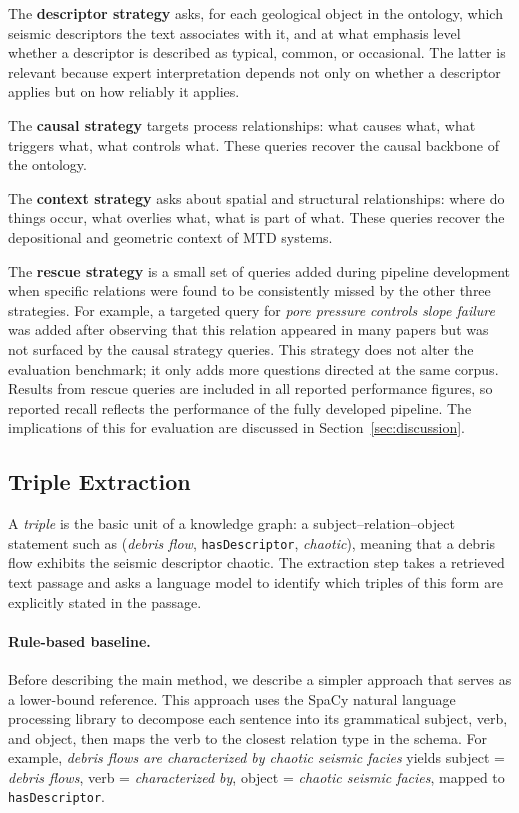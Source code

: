 \documentclass[10pt]{article}
\newcommand{\pred}[1]{\texttt{\small #1}}
\begin{document}
The \textbf{descriptor strategy} asks, for each geological
object in the ontology, which seismic descriptors the text
associates with it, and at what emphasis level  whether a
descriptor is described as typical, common, or occasional.
The latter is relevant because expert interpretation depends
not only on whether a descriptor applies but on how reliably
it applies.

The \textbf{causal strategy} targets process relationships:
what causes what, what triggers what, what controls what.
These queries recover the causal backbone of the ontology.

The \textbf{context strategy} asks about spatial and
structural relationships: where do things occur, what
overlies what, what is part of what.
These queries recover the depositional and geometric context
of MTD systems.

The \textbf{rescue strategy} is a small set of queries added
during pipeline development when specific relations were
found to be consistently missed by the other three
strategies.
For example, a targeted query for \emph{pore pressure
controls slope failure} was added after observing that this
relation appeared in many papers but was not surfaced by the
causal strategy queries.
This strategy does not alter the evaluation benchmark; it
only adds more questions directed at the same corpus.
Results from rescue queries are included in all reported
performance figures, so reported recall reflects the
performance of the fully developed pipeline.
The implications of this for evaluation are discussed in
Section~\ref{sec:discussion}.

\subsection{Triple Extraction}
\label{sec:extraction}

A \emph{triple} is the basic unit of a knowledge graph: a
subject--relation--object statement such as (\emph{debris
flow}, \pred{hasDescriptor}, \emph{chaotic}), meaning that
a debris flow exhibits the seismic descriptor chaotic.
The extraction step takes a retrieved text passage and asks
a language model to identify which triples of this form are
explicitly stated in the passage.

\paragraph{Rule-based baseline.}
Before describing the main method, we describe a simpler
approach that serves as a lower-bound reference.
This approach uses the SpaCy natural language processing
library \citep{honnibal2020spacy} to decompose each sentence
into its grammatical subject, verb, and object, then maps
the verb to the closest relation type in the schema.
For example, \emph{debris flows are characterized by chaotic
seismic facies} yields subject = \emph{debris flows},
verb = \emph{characterized by}, object = \emph{chaotic
seismic facies}, mapped to \pred{hasDescriptor}.
\end{document}
